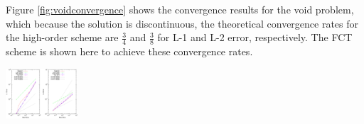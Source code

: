 Figure \ref{fig:voidconvergence} shows the convergence results for the void
problem, which because the solution is discontinuous, the theoretical
convergence rates for the high-order scheme are $\frac{3}{4}$ and $\frac{3}{8}$
for L-1 and L-2 error, respectively. The FCT scheme is shown here to
achieve these convergence rates.

\begin{tikzfigure}
  \includegraphics[width=0.20\textwidth]{figures/convergence_3_SSPRK33.pdf}
\end{tikzfigure}

